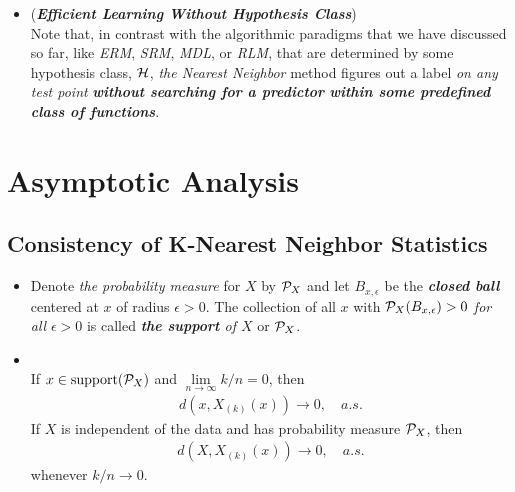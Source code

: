 \documentclass[11pt]{article}
\begin{document}
\begin{itemize}
\item \begin{remark} (\emph{\textbf{Efficient Learning Without Hypothesis Class}}) \citep{shalev2014understanding}\\
Note that, in contrast with the algorithmic paradigms that we have discussed so far, like \emph{ERM}, \emph{SRM}, \emph{MDL}, or \emph{RLM}, that are determined by some hypothesis class, ${\mathcal H}$, \emph{the Nearest Neighbor} method figures out a label \emph{on any test point} \emph{\textbf{without searching for a predictor} \textbf{within some predefined class of functions}}.
\end{remark}
\end{itemize}


\section{Asymptotic Analysis}
\subsection{Consistency of K-Nearest Neighbor Statistics}
\begin{itemize}
\item \begin{definition}
Denote \emph{the probability measure} for $X$ by ${\mathcal P}_{X}$ and let $B_{x, \epsilon}$ be the \emph{\textbf{closed ball}} centered at $x$ of radius $\epsilon > 0$. The collection of all $x$ with ${\mathcal P}_{X}(B_{x ,\epsilon}) > 0$ \emph{for all} $\epsilon > 0$ is called \emph{\textbf{the support} of $X$} or ${\mathcal P}_{X}$.
\end{definition}

\item \begin{lemma}\citep{devroye2013probabilistic}\\
If $x \in \text{support}({\mathcal P}_{X})$ and $\lim\limits_{n\rightarrow \infty}k/n = 0$, then 
\begin{align*}
d(x,X_{(k)}(x)) \rightarrow 0, \quad a.s.
\end{align*} 
If $X$ is independent of the data and has probability measure ${\mathcal P}_{X}$, then 
\begin{align*}
d(X, X_{(k)}(x)) \rightarrow 0, \quad a.s.
\end{align*}   whenever $k/n \rightarrow 0$.
\end{lemma}
\end{itemize}
\end{document}
